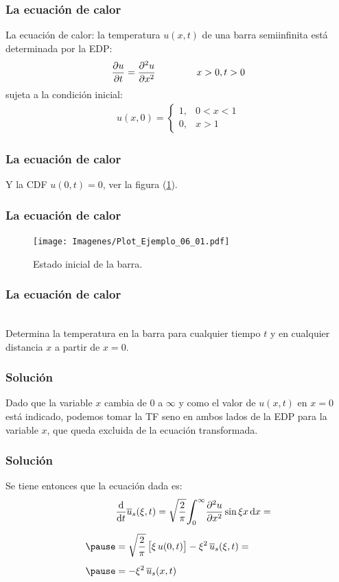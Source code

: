 \begin{frame}
\frametitle{La ecuación de calor}
La ecuación de calor: la temperatura $u (x, t)$ de una barra semiinfinita está determinada por la EDP:
\pause
\begin{align*}
\pdv{u}{t} = \pdv[2]{u}{x} \hspace{1.5cm} x > 0, t > 0
\end{align*}
\pause
sujeta a la condición inicial:
\pause
\begin{align*}
u (x, 0) = \begin{cases}
1, & 0 < x < 1  \\
0, & x > 1
\end{cases}
\end{align*}
\end{frame}
\begin{frame}
\frametitle{La ecuación de calor}
Y la CDF $u (0, t) = 0$, ver la figura (\ref{fig:figura_plot_Ejemplo_06_01}).
\end{frame}
\begin{frame}
\frametitle{La ecuación de calor}
\begin{figure}[H]
  \centering
  \texttt{[image: Imagenes/Plot\_Ejemplo\_06\_01.pdf]}
  \caption{Estado inicial de la barra.}
  \label{fig:figura_plot_Ejemplo_06_01}
\end{figure}
\end{frame}
\begin{frame}
\frametitle{La ecuación de calor}
\\
\bigskip
Determina la temperatura en la barra para cualquier tiempo $t$ y en cualquier distancia $x$ a partir de $x = 0$.
\end{frame}
\begin{frame}
\frametitle{Solución}
Dado que la variable $x$ cambia de $0$ a $\infty$ y como el valor de $u(x, t)$ en $x = 0$ está indicado, \pause podemos tomar la TF seno en ambos lados de la EDP para la variable $x$, que queda excluida de la ecuación transformada.
\end{frame}
\begin{frame}
\frametitle{Solución}
Se tiene entonces que la ecuación dada es:
\pause
\begin{eqnarray*}
\begin{aligned}
&\dv{t} \overline{u}_{s} (\xi, t) = \sqrt{\dfrac{2}{\pi}} \scaleint{6ex}_{\bs 0}^{\infty} \pdv[2]{u}{x} \sin \xi x \dd{x} = \\[0.5em] \pause
&= \sqrt{\dfrac{2}{\pi}} \, \big[ \xi \, u(0, t) \big] - \xi^{2} \, \overline{u}_{s} (\xi, t) = \\[0.5em] \pause
&= - \xi^{2} \, \overline{u}_{s} (x , t)
\end{aligned}
\end{eqnarray*}
\end{frame}
